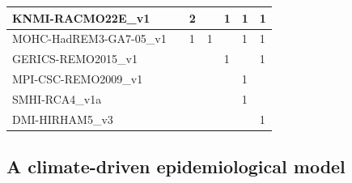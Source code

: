 \begin{table}[H]
{\begin{tabular}{l|l|l|l|l|l|l}
            \\
            \hline
            KNMI-RACMO22E\_v1                &              & 2          &
                                             & 1            & 1          & 1
            \\
            \hline
            MOHC-HadREM3-GA7-05\_v1          &              & 1          & 1
                                             &              & 1          & 1
            \\
            \hline
            GERICS-REMO2015\_v1              &              &            &
                                             & 1            &            & 1
            \\
            \hline
            MPI-CSC-REMO2009\_v1             &              &            &
                                             &              & 1          &
            \\
            \hline
            SMHI-RCA4\_v1a                   &              &            &
                                             &              & 1          &
            \\
            \hline
            DMI-HIRHAM5\_v3                  &              &            &
                                             &              &            & 1
            \\
            \hline
        \end{tabular}%
    }
\end{table}

\subsection{A climate-driven epidemiological model}


